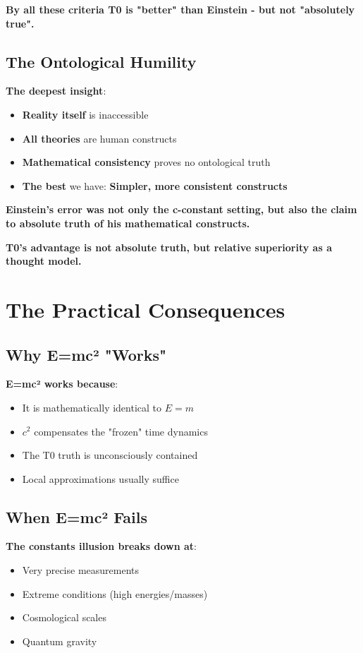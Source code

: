 \documentclass[12pt,a4paper]{article}
\begin{document}
	\textbf{By all these criteria T0 is "better" than Einstein - but not "absolutely true".}
	
	\subsection{The Ontological Humility}
	
	\textbf{The deepest insight}:
	\begin{itemize}
		\item \textbf{Reality itself} is inaccessible
		\item \textbf{All theories} are human constructs
		\item \textbf{Mathematical consistency} proves no ontological truth
		\item \textbf{The best} we have: \textbf{Simpler, more consistent constructs}
	\end{itemize}
	
	\textbf{Einstein's error was not only the c-constant setting, but also the claim to absolute truth of his mathematical constructs.}
	
	\textbf{T0's advantage is not absolute truth, but relative superiority as a thought model.}
	
	\section{The Practical Consequences}
	
	\subsection{Why E=mc² "Works"}
	
	\textbf{E=mc² works because}:
	\begin{itemize}
		\item It is mathematically identical to $E = m$
		\item $c^2$ compensates the "frozen" time dynamics
		\item The T0 truth is unconsciously contained
		\item Local approximations usually suffice
	\end{itemize}
	
	\subsection{When E=mc² Fails}
	
	\textbf{The constants illusion breaks down at}:
	\begin{itemize}
		\item Very precise measurements
		\item Extreme conditions (high energies/masses)
		\item Cosmological scales
		\item Quantum gravity
	\end{itemize}
	
\end{document}
